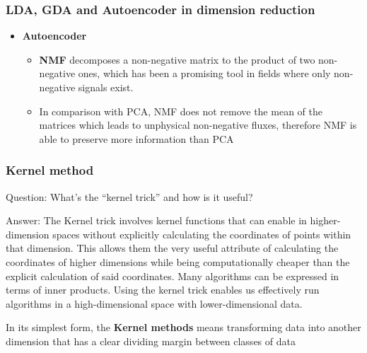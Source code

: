 \documentclass[11pt]{beamer}
\begin{document}
\begin{frame}
\frametitle{LDA, GDA and Autoencoder in dimension reduction}
\begin{itemize}
	\item \textbf{Autoencoder}
	\begin{itemize}
		\item \textbf{NMF} decomposes a non-negative matrix to the product of two non-negative ones, which has been a promising tool in fields where only non-negative signals exist.
		\item In comparison with PCA, NMF does not remove the mean of the matrices which leads to unphysical non-negative fluxes, therefore NMF is able to preserve more information than PCA
	\end{itemize}
\end{itemize}
\end{frame}

\begin{frame}
\frametitle{Kernel method}
\begin{block}{Question:}
	What’s the “kernel trick” and how is it useful?
\end{block}
\begin{block}{Answer:}
	The Kernel trick involves kernel functions that can enable in higher-dimension spaces without explicitly calculating the coordinates of points within that dimension. This allows them the very useful attribute of calculating the coordinates of higher dimensions while being computationally cheaper than the explicit calculation of said coordinates. Many algorithms can be expressed in terms of inner products. Using the kernel trick enables us effectively run algorithms in a high-dimensional space with lower-dimensional data.
	
	 In its simplest form, the \textbf{Kernel methods} means transforming data into another dimension that has a clear dividing margin between classes of data 
\end{block}
\end{frame}
\end{document}
